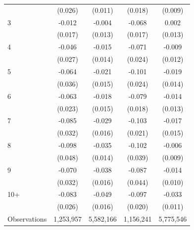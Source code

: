 \begin{table}[htbp]
\begin{tabular}{l*{4}{c}}
            &     (0.026)         &     (0.011)         &     (0.018)         &     (0.009)         \\
[1em]
3           &      -0.012         &      -0.004         &      -0.068\sym{***}&       0.002         \\
            &     (0.017)         &     (0.013)         &     (0.017)         &     (0.013)         \\
[1em]
4           &      -0.046\sym{*}  &      -0.015         &      -0.071\sym{***}&      -0.009         \\
            &     (0.027)         &     (0.014)         &     (0.024)         &     (0.012)         \\
[1em]
5           &      -0.064\sym{*}  &      -0.021         &      -0.101\sym{***}&      -0.019         \\
            &     (0.036)         &     (0.015)         &     (0.024)         &     (0.014)         \\
[1em]
6           &      -0.063\sym{***}&      -0.018         &      -0.079\sym{***}&      -0.014         \\
            &     (0.023)         &     (0.015)         &     (0.018)         &     (0.013)         \\
[1em]
7           &      -0.085\sym{***}&      -0.029\sym{*}  &      -0.103\sym{***}&      -0.017         \\
            &     (0.032)         &     (0.016)         &     (0.021)         &     (0.015)         \\
[1em]
8           &      -0.098\sym{**} &      -0.035\sym{**} &      -0.102\sym{***}&      -0.006         \\
            &     (0.048)         &     (0.014)         &     (0.039)         &     (0.009)         \\
[1em]
9           &      -0.070\sym{**} &      -0.038\sym{**} &      -0.087\sym{**} &      -0.014         \\
            &     (0.032)         &     (0.016)         &     (0.044)         &     (0.010)         \\
[1em]
10+         &      -0.083\sym{***}&      -0.049\sym{***}&      -0.097\sym{***}&      -0.033\sym{***}\\
            &     (0.026)         &     (0.016)         &     (0.020)         &     (0.011)         \\
\hline
Observations&   1,253,957         &   5,582,166         &   1,156,241         &   5,775,546         \\

\end{tabular}
\end{table}
